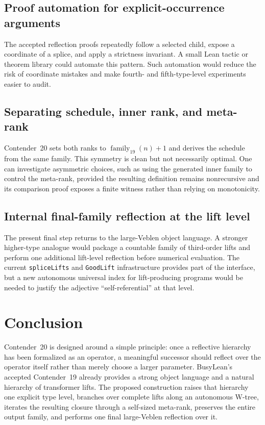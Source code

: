 \documentclass[11pt]{article}
\theoremstyle{definition}
\theoremstyle{remark}
\newcommand{\leanname}[1]{\nolinkurl{#1}}
\begin{document}
\subsection{Proof automation for explicit-occurrence arguments}

The accepted reflection proofs repeatedly follow a selected child, expose a
coordinate of a splice, and apply a strictness invariant.  A small Lean tactic
or theorem library could automate this pattern.  Such automation would reduce
the risk of coordinate mistakes and make fourth- and fifth-type-level
experiments easier to audit.

\subsection{Separating schedule, inner rank, and meta-rank}

Contender~20 sets both ranks to $\operatorname{family}_{19}(n)+1$ and derives
the schedule from the same family.  This symmetry is clean but not necessarily
optimal.  One can investigate asymmetric choices, such as using the generated
inner family to control the meta-rank, provided the resulting definition
remains nonrecursive and its comparison proof exposes a finite witness rather
than relying on monotonicity.

\subsection{Internal final-family reflection at the lift level}

The present final step returns to the large-Veblen object language.  A stronger
higher-type analogue would package a countable family of third-order lifts and
perform one additional lift-level reflection before numerical evaluation.  The
current \leanname{spliceLifts} and \leanname{GoodLift} infrastructure provides
part of the interface, but a new autonomous universal index for lift-producing
programs would be needed to justify the adjective ``self-referential'' at that
level.

\section{Conclusion}

Contender~20 is designed around a simple principle: once a reflective
hierarchy has been formalized as an operator, a meaningful successor should
reflect over the operator itself rather than merely choose a larger parameter.
BusyLean's accepted Contender~19 already provides a strong object language and
a natural hierarchy of transformer lifts.  The proposed construction raises
that hierarchy one explicit type level, branches over complete lifts along an
autonomous W-tree, iterates the resulting closure through a self-sized
meta-rank, preserves the entire output family, and performs one final
large-Veblen reflection over it.
\end{document}
